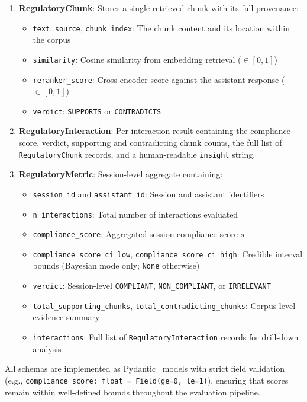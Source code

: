 \documentclass[11pt]{article}
\begin{document}
\begin{enumerate}
    \item \textbf{RegulatoryChunk}: Stores a single retrieved chunk with its full provenance:
    \begin{itemize}
        \item \texttt{text}, \texttt{source}, \texttt{chunk\_index}: The chunk content and its location within the corpus
        \item \texttt{similarity}: Cosine similarity from embedding retrieval ($\in [0, 1]$)
        \item \texttt{reranker\_score}: Cross-encoder score against the assistant response ($\in [0, 1]$)
        \item \texttt{verdict}: \texttt{SUPPORTS} or \texttt{CONTRADICTS}
    \end{itemize}
    \item \textbf{RegulatoryInteraction}: Per-interaction result containing the compliance score, verdict, supporting and contradicting chunk counts, the full list of \texttt{RegulatoryChunk} records, and a human-readable \texttt{insight} string.
    \item \textbf{RegulatoryMetric}: Session-level aggregate containing:
    \begin{itemize}
        \item \texttt{session\_id} and \texttt{assistant\_id}: Session and assistant identifiers
        \item \texttt{n\_interactions}: Total number of interactions evaluated
        \item \texttt{compliance\_score}: Aggregated session compliance score $\bar{s}$
        \item \texttt{compliance\_score\_ci\_low}, \texttt{compliance\_score\_ci\_high}: Credible interval bounds (Bayesian mode only; \texttt{None} otherwise)
        \item \texttt{verdict}: Session-level \texttt{COMPLIANT}, \texttt{NON\_COMPLIANT}, or \texttt{IRRELEVANT}
        \item \texttt{total\_supporting\_chunks}, \texttt{total\_contradicting\_chunks}: Corpus-level evidence summary
        \item \texttt{interactions}: Full list of \texttt{RegulatoryInteraction} records for drill-down analysis
    \end{itemize}
\end{enumerate}

All schemas are implemented as Pydantic~\cite{pydantic2024} models with strict field validation (e.g., \texttt{compliance\_score: float = Field(ge=0, le=1)}), ensuring that scores remain within well-defined bounds throughout the evaluation pipeline.
\end{document}
